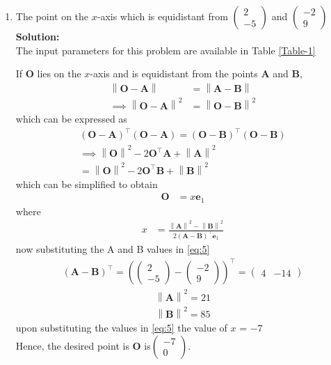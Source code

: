 \documentclass[12pt]{article}
\providecommand{\brak}[1]{\ensuremath{\left(#1\right)}}
\providecommand{\norm}[1]{\left\lVert#1\right\rVert}
\newcommand{\solution}{\noindent \textbf{Solution: }}
\newcommand{\myvec}[1]{\ensuremath{\begin{pmatrix}#1\end{pmatrix}}}
\let\vec\mathbf
\begin{document}
\begin{enumerate}

\item The point on the $x$-axis which is equidistant from $\myvec{2 \\ -5}$ and $\myvec{-2\\9}$\\

\solution \\The input parameters for this problem are available in Table \eqref{Table-1}
\begin{table}[ht!]

\caption{}
\label{Table-1}	
\end{table}

  If $\vec{O}$ lies on the  $x$-axis and is  equidistant from the points $\vec{A}$ and $\vec{B}$, 
\begin{align}
 \norm{\vec{O}-\vec{A}} &=
\norm{\vec{A}-\vec{B}} 
\\
 \implies \norm{\vec{O}-\vec{A}}^2 &=
\norm{\vec{O}-\vec{B}}^2 
\end{align}
which can be expressed as 
\begin{multline}
 \brak{\vec{O}-\vec{A}}^{\top} \brak{\vec{O}-\vec{A}}=
 \brak{\vec{O}-\vec{B}}^{\top} 
\brak{\vec{O}-\vec{B}}
\\
 \implies \norm{\vec{O}}^2-2{\vec{O}}^{\top}\vec{A} + \norm{\vec{A}}^2
 \\= \norm{\vec{O}}^2-2{\vec{O}}^{\top}\vec{B} + \norm{\vec{B}}^2
\end{multline}
which can be simplified to obtain
  \begin{align}
   \vec{O} &=
    x\vec{e}_1
  \end{align}
  where 
  \begin{align}
   x &=\frac{\norm{\vec{A}}^2 -\norm{\vec{B}}^2 }{2\brak{\vec{A}-\vec{B}}^{\top }\vec{e}_1
}\label{eq:5}  
  \end{align}
  now substituting the A and B values in \eqref{eq:5}
\begin{align}
 \brak{\vec{A}-\vec{B}}^{\top}=
 \brak{\myvec{2 \\ -5}-\myvec{-2\\9}}^{\top}
 =\myvec{4 & -14}
\end{align}
  \begin{align}
   \norm{\vec{A}}^2 = 21
    \end{align}
 \begin{align}
   \norm{\vec{B}}^2 = 85
    \end{align}
upon   substituting the values in \eqref{eq:5} the value of $x$ = $ -7$
\\Hence, the desired point is $\vec{O}$ is$\myvec{ -7 \\ 0}$.


\end{enumerate}
\end{document}
